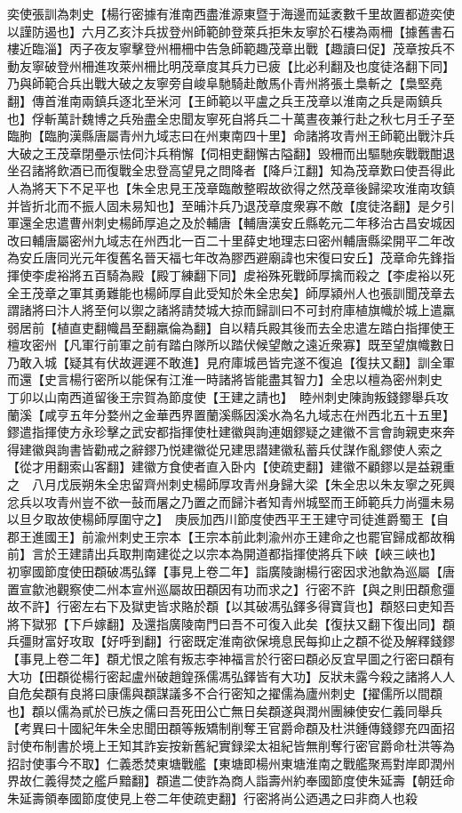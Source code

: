 奕使張訓為刺史【楊行密據有淮南西盡淮源東暨于海邊而延袤數千里故置都遊奕使以謹防遏也】六月乙亥汴兵拔登州師範帥登萊兵拒朱友寧於石樓為兩柵【據舊書石樓近臨淄】丙子夜友寧擊登州柵柵中告急師範趣茂章出戰【趣讀曰促】茂章按兵不動友寧破登州柵進攻萊州柵比明茂章度其兵力已疲【比必利翻及也度徒洛翻下同】乃與師範合兵出戰大破之友寧旁自峻阜馳騎赴敵馬仆青州將張土梟斬之【梟堅堯翻】傳首淮南兩鎮兵逐北至米河【王師範以平盧之兵王茂章以淮南之兵是兩鎮兵也】俘斬萬計魏博之兵殆盡全忠聞友寧死自將兵二十萬晝夜兼行赴之秋七月壬子至臨胊【臨朐漢縣唐屬青州九域志曰在州東南四十里】命諸將攻青州王師範出戰汴兵大破之王茂章閉壘示怯伺汴兵稍懈【伺相吏翻懈古隘翻】毁柵而出驅馳疾戰戰酣退坐召諸將飲酒已而復戰全忠登高望見之問降者【降戶江翻】知為茂章歎曰使吾得此人為將天下不足平也【朱全忠見王茂章臨敵整暇故欲得之然茂章後歸梁攻淮南攻鎮并皆折北而不振人固未易知也】至晡汴兵乃退茂章度衆寡不敵【度徒洛翻】是夕引軍還全忠遣曹州刺史楊師厚追之及於輔唐【輔唐漢安丘縣乾元二年移治古昌安城因改曰輔唐屬密州九域志在州西北一百二十里薛史地理志曰密州輔唐縣梁開平二年改為安丘唐同光元年復舊名晉天福七年改為膠西避廟諱也宋復曰安丘】茂章命先鋒指揮使李䖍裕將五百騎為殿【殿丁練翻下同】䖍裕殊死戰師厚擒而殺之【李䖍裕以死全王茂章之軍其勇難能也楊師厚自此受知於朱全忠矣】師厚潁州人也張訓聞茂章去謂諸將曰汴人將至何以禦之諸將請焚城大掠而歸訓曰不可封府庫植旗幟於城上遣羸弱居前【植直吏翻幟昌至翻羸倫為翻】自以精兵殿其後而去全忠遣左踏白指揮使王檀攻密州【凡軍行前軍之前有踏白隊所以踏伏候望敵之遠近衆寡】既至望旗幟數日乃敢入城【疑其有伏故遲遲不敢進】見府庫城邑皆完遂不復追【復扶又翻】訓全軍而還【史言楊行密所以能保有江淮一時諸將皆能盡其智力】全忠以檀為密州刺史　丁卯以山南西道留後王宗賀為節度使【王建之請也】　睦州刺史陳詢叛錢鏐舉兵攻蘭溪【咸亨五年分婺州之金華西界置蘭溪縣因溪水為名九域志在州西北五十五里】鏐遣指揮使方永珍擊之武安都指揮使杜建徽與詢連姻鏐疑之建徽不言會詢親吏來奔得建徽與詢書皆勸戒之辭鏐乃悦建徽從兄建思譛建徽私蓄兵仗謀作亂鏐使人索之【從才用翻索山客翻】建徽方食使者直入卧内【使疏吏翻】建徽不顧鏐以是益親重之　八月戊辰朔朱全忠留齊州刺史楊師厚攻青州身歸大梁【朱全忠以朱友寧之死興忿兵以攻青州豈不欲一鼔而屠之乃置之而歸汴者知青州城堅而王師範兵力尚彊未易以旦夕取故使楊師厚圍守之】　庚辰加西川節度使西平王王建守司徒進爵蜀王【自郡王進國王】前渝州刺史王宗本【王宗本前此刺渝州亦王建命之也罷官歸成都故稱前】言於王建請出兵取荆南建從之以宗本為開道都指揮使將兵下峽【峽三峽也】　初寧國節度使田頵破馮弘鐸【事見上卷二年】詣廣陵謝楊行密因求池歙為巡屬【唐置宣歙池觀察使二州本宣州巡屬故田頵因有功而求之】行密不許【與之則田頵愈彊故不許】行密左右下及獄吏皆求賂於頵【以其破馮弘鐸多得寶貨也】頵怒曰吏知吾將下獄邪【下戶嫁翻】及還指廣陵南門曰吾不可復入此矣【復扶又翻下復出同】頵兵彊財富好攻取【好呼到翻】行密既定淮南欲保境息民每抑止之頵不從及解釋錢鏐【事見上卷二年】頵尤恨之隂有叛志李神福言於行密曰頵必反宜早圖之行密曰頵有大功【田頵從楊行密起盧州破趙鍠孫儒馮弘鐸皆有大功】反狀未露今殺之諸將人人自危矣頵有良將曰康儒與頵謀議多不合行密知之擢儒為廬州刺史【擢儒所以間頵也】頵以儒為貳於已族之儒曰吾死田公亡無日矣頵遂與潤州團練使安仁義同舉兵　【考異曰十國紀年朱全忠聞田頵等叛矯制削奪王官爵命頵及杜洪鍾傳錢鏐充四面招討使布制書於境上王知其詐妄按新舊紀實録梁太祖紀皆無削奪行密官爵命杜洪等為招討使事今不取】仁義悉焚東塘戰艦【東塘即楊州東塘淮南之戰艦聚焉對岸即潤州界故仁義得焚之艦戶黯翻】頵遣二使詐為商人詣壽州約奉國節度使朱延壽【朝廷命朱延壽領奉國節度使見上卷二年使疏吏翻】行密將尚公迺遇之曰非商人也殺